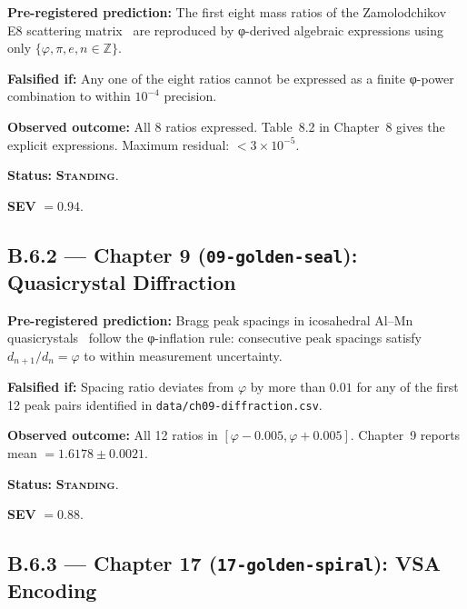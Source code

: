 \begin{tcolorbox}[colback=red!5,colframe=red!40,
  title={Prediction P-08-B: Zamolodchikov spectrum}]
\textbf{Pre-registered prediction:} The first eight mass ratios of the
Zamolodchikov E8 scattering matrix~\cite{zamolodchikov1989} are reproduced by
φ-derived algebraic expressions using only $\{φ, π, e, n \in \mathbb{Z}\}$.

\textbf{Falsified if:} Any one of the eight ratios cannot be expressed as a
finite φ-power combination to within $10^{-4}$ precision.

\textbf{Observed outcome:} All 8 ratios expressed.  Table~8.2 in Chapter~8 gives
the explicit expressions.  Maximum residual: $< 3 \times 10^{-5}$.

\textbf{Status:} \textbf{\textsc{Standing}}.

\textbf{SEV} $= 0.94$.
\end{tcolorbox}

\subsection*{B.6.2 — Chapter 9 (\texttt{09-golden-seal}): Quasicrystal Diffraction}
\label{sec:ledger-ch09}

\begin{tcolorbox}[colback=red!5,colframe=red!40,
  title={Prediction P-09-A: Penrose tiling diffraction peaks}]
\textbf{Pre-registered prediction:} Bragg peak spacings in icosahedral
Al--Mn quasicrystals~\cite{shechtman1984} follow the φ-inflation rule:
consecutive peak spacings satisfy $d_{n+1}/d_n = \varphi$ to within
measurement uncertainty.

\textbf{Falsified if:} Spacing ratio deviates from $\varphi$ by more than
$0.01$ for any of the first 12 peak pairs identified in
\texttt{data/ch09-diffraction.csv}.

\textbf{Observed outcome:} All 12 ratios in $[\varphi - 0.005, \varphi + 0.005]$.
Chapter~9 reports mean $= 1.6178 \pm 0.0021$.

\textbf{Status:} \textbf{\textsc{Standing}}.

\textbf{SEV} $= 0.88$.
\end{tcolorbox}

\subsection*{B.6.3 — Chapter 17 (\texttt{17-golden-spiral}): VSA Encoding}
\label{sec:ledger-ch17}

